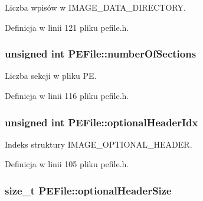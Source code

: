 Liczba wpisów w I\-M\-A\-G\-E\-\_\-\-D\-A\-T\-A\-\_\-\-D\-I\-R\-E\-C\-T\-O\-R\-Y. 



Definicja w linii 121 pliku pefile.\-h.

\hypertarget{class_p_e_file_aa80eaa25eb050efe1bfced2518e21842}{
\subsubsection[{number\-Of\-Sections}]{\setlength{\rightskip}{0pt plus 5cm}unsigned int P\-E\-File\-::number\-Of\-Sections\hspace{0.3cm}{\ttfamily [private]}}}\label{class_p_e_file_aa80eaa25eb050efe1bfced2518e21842}


Liczba sekcji w pliku P\-E. 



Definicja w linii 116 pliku pefile.\-h.

\hypertarget{class_p_e_file_a56b4375d7c13859e289bfa6e6f58fffc}{
\subsubsection[{optional\-Header\-Idx}]{\setlength{\rightskip}{0pt plus 5cm}unsigned int P\-E\-File\-::optional\-Header\-Idx\hspace{0.3cm}{\ttfamily [private]}}}\label{class_p_e_file_a56b4375d7c13859e289bfa6e6f58fffc}


Indeks struktury I\-M\-A\-G\-E\-\_\-\-O\-P\-T\-I\-O\-N\-A\-L\-\_\-\-H\-E\-A\-D\-E\-R. 



Definicja w linii 105 pliku pefile.\-h.

\hypertarget{class_p_e_file_a4f2168508a33d89fa8a28b7912be97e3}{
\subsubsection[{optional\-Header\-Size}]{\setlength{\rightskip}{0pt plus 5cm}size\-\_\-t P\-E\-File\-::optional\-Header\-Size\hspace{0.3cm}{\ttfamily [private]}}}\label{class_p_e_file_a4f2168508a33d89fa8a28b7912be97e3}


